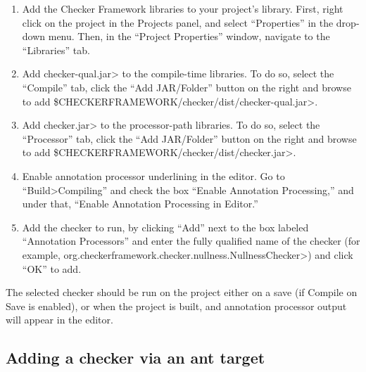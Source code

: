 \begin{enumerate}
\item
  Add the Checker Framework libraries to your project's
  library. First, right click on the project in the Projects panel,
  and select ``Properties'' in the drop-down menu. Then, in the
  ``Project Properties'' window, navigate to the ``Libraries'' tab.

\item
  Add \<checker-qual.jar> to the compile-time libraries. To do so,
  select the ``Compile'' tab, click the ``Add JAR/Folder'' button on
  the right and browse to
  add \<\$CHECKERFRAMEWORK/checker/dist/checker-qual.jar>.

\item
  Add \<checker.jar> to the processor-path libraries. To do so, select
  the ``Processor'' tab, click the ``Add JAR/Folder'' button on the
  right and browse to
  add \<\$CHECKERFRAMEWORK/checker/dist/checker.jar>.

\item
  Enable annotation processor underlining in the editor. Go to
  ``Build>Compiling'' and check the box ``Enable Annotation
  Processing,'' and under that, ``Enable Annotation Processing in
  Editor.''

\item
  Add the checker to run, by clicking ``Add'' next to the box labeled
  ``Annotation Processors'' and enter the fully qualified name of the
  checker (for
  example, \<org.checkerframework.checker.nullness.NullnessChecker>)
  and click ``OK'' to add.
\end{enumerate}

The selected checker should be run on the project either on a save (if
Compile on Save is enabled), or when the project is built, and
annotation processor output will appear in the editor.


\subsection {Adding a checker via an ant target\label{netbeans-ant-target}}

